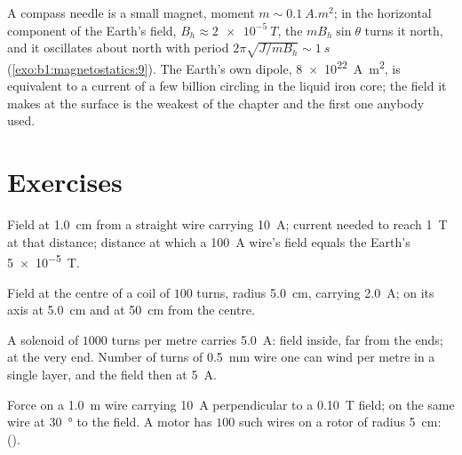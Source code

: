\begin{example}\label{ex:b1:magnetostatics:compass}
A compass needle is a small magnet, moment $m \sim \qty{0.1}{A.m^2}$; in the
horizontal component of the Earth's field, $B_h \approx \qty{2e-5}{T}$, the
 $mB_h\sin\theta$ turns it north, and it oscillates about north with
period $2\pi\sqrt{J/mB_h} \sim \qty{1}{s}$ (\cref{exo:b1:magnetostatics:9}).
The Earth's own dipole, \qty{8e22}{A.m^2}, is equivalent to a current of
a few billion  circling in the liquid iron core; the field it
makes at the surface is the weakest of the chapter and the first one
anybody used.
\end{example}

\section{Exercises}

\begin{exercise}[$\star$]\label{exo:b1:magnetostatics:1}
Field at \qty{1.0}{cm} from a straight wire carrying \qty{10}{A}; current
needed to reach \qty{1}{T} at that distance; distance at which a
\qty{100}{A} wire's field equals the Earth's \qty{5e-5}{T}.
\end{exercise}

\begin{exercise}[$\star$]\label{exo:b1:magnetostatics:2}
Field at the centre of a coil of $100$ turns, radius \qty{5.0}{cm},
carrying \qty{2.0}{A}; on its axis at \qty{5.0}{cm} and at \qty{50}{cm}
from the centre.
\end{exercise}

\begin{exercise}[$\star$]\label{exo:b1:magnetostatics:3}
A solenoid of $1000$ turns per metre carries \qty{5.0}{A}: field inside,
far from the ends; at the very end. Number of turns of \qty{0.5}{mm}
wire one can wind per metre in a single layer, and the field then at
\qty{5}{A}.
\end{exercise}

\begin{exercise}[$\star$]\label{exo:b1:magnetostatics:4}
Force on a \qty{1.0}{m} wire carrying \qty{10}{A} perpendicular to a
\qty{0.10}{T} field; on the same wire at \qty{30}{\degree} to the field.
A motor has $100$ such wires on a rotor of radius \qty{5}{cm}: 
().
\end{exercise}

